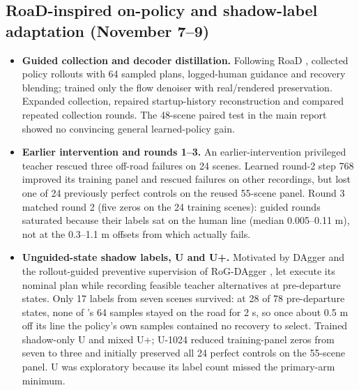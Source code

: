 \subsection{RoaD-inspired on-policy and shadow-label adaptation (November 7--9)}
\begin{itemize}\setlength{\itemsep}{3pt}\setlength{\parsep}{0pt}\setlength{\parskip}{0pt}\setlength{\topsep}{3pt}
\item \textbf{Guided collection and decoder distillation.} Following RoaD \cite{road}, collected policy rollouts with 64 sampled plans, logged-human guidance and recovery blending; trained only the flow denoiser with real/rendered preservation. Expanded collection, repaired startup-history reconstruction and compared repeated collection rounds. The 48-scene paired test in the main report showed no convincing general learned-policy gain.
\item \textbf{Earlier intervention and rounds 1--3.} An earlier-intervention privileged teacher rescued three off-road failures on 24 scenes. Learned round-2 step 768 improved its training panel and rescued failures on other recordings, but lost one of 24 previously perfect controls on the reused 55-scene panel. Round 3 matched round 2 (five zeros on the 24 training scenes): guided rounds saturated because their labels sat on the human line (median 0.005--0.11 m), not at the 0.3--1.1 m offsets from which \lf{} actually fails.
\item \textbf{Unguided-state shadow labels, U and U+.} Motivated by DAgger \cite{dagger} and the rollout-guided preventive supervision of RoG-DAgger \cite{rogdagger}, let \lf{} execute its nominal plan while recording feasible teacher alternatives at pre-departure states. Only 17 labels from seven scenes survived: at 28 of 78 pre-departure states, none of \lf{}'s 64 samples stayed on the road for 2 s, so once about 0.5 m off its line the policy's own samples contained no recovery to select. Trained shadow-only U and mixed U+; U-1024 reduced training-panel zeros from seven to three and initially preserved all 24 perfect controls on the 55-scene panel. U was exploratory because its label count missed the primary-arm minimum.

\end{itemize}
